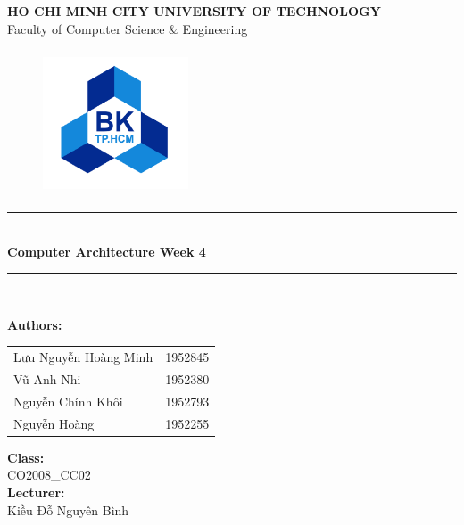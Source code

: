 \documentclass[12pt,a4paper]{article}
\newcommand\HRule{\rule{12cm}{1pt}}
\begin{document}
\begin{titlepage}

  \begin{center}

    \textbf{\fontsize{12pt}{1pt}\selectfont HO CHI MINH CITY UNIVERSITY OF TECHNOLOGY}\\[0.5cm]
    {\fontsize{13pt}{1pt}\selectfont Faculty of Computer Science \& Engineering}\\[0.5cm]
    \begin{figure}[H]
      \centering
      \includegraphics[width=1.7in,height=1.7in]{BK.png}
    \end{figure}

    \HRule\\[0.5cm]
    { \textbf{\fontsize{25pt}{1pt}\selectfont Computer Architecture Week 4}}\\[0.4cm]

    \HRule\\[0.8cm]
    \begin{minipage}{0.545\textwidth}
      \begin{flushleft}
        \textbf{Authors:}\\
        \begin{tabular}{l l}
          Lưu Nguyễn Hoàng Minh & 1952845 \\
          Vũ Anh Nhi            & 1952380 \\
          Nguyễn Chính Khôi     & 1952793 \\
          Nguyễn Hoàng          & 1952255 \\
        \end{tabular}
      \end{flushleft}
    \end{minipage}
    \begin{minipage}{0.4\textwidth}
      \begin{flushright}
        \textbf{Class:}\\
        CO2008\_CC02\\
        \textbf{Lecturer:}\\
        Kiều Đỗ Nguyên Bình\\


\end{flushright}
\end{minipage}
\end{center}
\end{titlepage}
\end{document}
